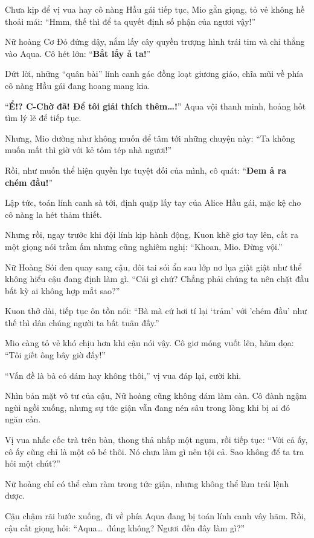 \documentclass[../main.tex]{subfiles}
\begin{document}
Chưa kịp để vị vua hay cô nàng Hầu gái tiếp tục, Mio gằn giọng, tỏ vẻ không hề thoải mái: ``Hmm, thế thì để ta quyết định số phận của ngươi vậy!''

Nữ hoàng Cơ Đỏ đứng dậy, nắm lấy cây quyền trượng hình trái tim và chỉ thẳng vào Aqua. Cô hét lớn: ``\textbf{Bắt lấy ả ta!}''

Dứt lời, những ``quân bài'' lính canh gác đồng loạt giương giáo, chĩa mũi về phía cô nàng Hầu gái đang hoang mang kia.

``\textbf{Ể!? C-Chờ đã! Để tôi giải thích thêm\dots!}'' Aqua vội thanh minh, hoảng hốt tìm lý lẽ để tiếp tục.

Nhưng, Mio dường như không muốn để tâm tới những chuyện này: ``Ta không muốn mất thì giờ với kẻ tôm tép nhà ngươi!''

Rồi, như muốn thể hiện quyền lực tuyệt đối của mình, cô quát: ``\textbf{Đem ả ra chém đầu!}''

Lập tức, toán lính canh sà tới, định quặp lấy tay của Alice Hầu gái, mặc kệ cho cô nàng la hét thảm thiết.

Nhưng rồi, ngay trước khi đội lính kịp hành động, Kuon khẽ giơ tay lên, cất ra một giọng nói trầm ấm nhưng cũng nghiêm nghị: ``Khoan, Mio. Đừng vội.''

Nữ Hoàng Sói đen quay sang cậu, đôi tai sói ẩn sau lớp nơ lụa giật giật như thể không hiểu cậu đang định làm gì. ``Cái gì chứ? Chẳng phải chúng ta nên chặt đầu bất kỳ ai không hợp mắt sao?''

Kuon thở dài, tiếp tục ôn tồn nói: ``Bà mà cứ hơi tí lại `trảm' với 'chém đầu' như thế thì dân chúng người ta bất tuân đấy.''

Mio càng tỏ vẻ khó chịu hơn khi cậu nói vậy. Cô giơ móng vuốt lên, hăm dọa: ``Tôi giết ông bây giờ đấy!''

``Vấn đề là bà có dám hay không thôi,'' vị vua đáp lại, cười khì.

Nhìn bản mặt vô tư của cậu, Nữ hoàng cũng không dám làm càn. Cô đành ngậm ngùi ngồi xuống, nhưng sự tức giận vẫn đang nén sâu trong lòng khi bị ai đó ngăn cản.

Vị vua nhấc cốc trà trên bàn, thong thả nhấp một ngụm, rồi tiếp tục: ``Với cả ấy, cô ấy cũng chỉ là một cô bé thôi. Nó chưa làm gì nên tội cả. Sao không để ta tra hỏi một chút?''

Nữ hoàng chỉ có thể càm ràm trong tức giận, nhưng không thể làm trái lệnh được.

Cậu chậm rãi bước xuống, đi về phía Aqua đang bị toán lính canh vây hãm. Rồi, cậu cất giọng hỏi: ``Aqua\dots\ đúng không? Ngươi đến đây làm gì?''
\end{document}
